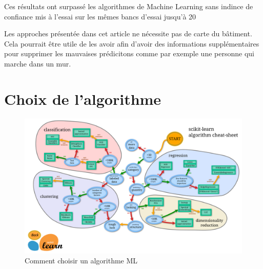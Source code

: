 Ces résultats ont surpassé les algorithmes de Machine Learning sans indince de confiance mis à l'essai sur les mêmes bancs d'essai jusqu'à 20%

Les approches présentée dans cet article ne nécessite pas de carte du bâtiment. Cela pourrait être utile de les avoir afin d'avoir des informations supplémentaires pour supprimer les mauvaises prédicitons comme par exemple une personne qui marche dans un mur. 


\section{Choix de l'algorithme}

\begin{figure}[H]
	\begin{center}
		\includegraphics[scale=0.12]{figures/scikiLearn.png}
		\caption{Comment choisir un algorithme ML}
		\label{fig:scikiLearn} %
	\end{center}
\end{figure}

